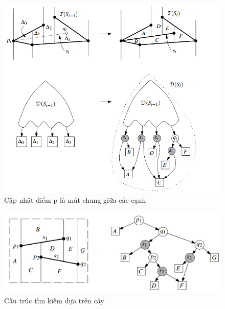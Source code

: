 \documentclass[a4paper,12pt]{report}
\begin{document}
\begin{figure}[H]
\centering
\includegraphics[scale=0.4]{updateT2.png}
\caption{Cập nhật điểm p là mút chung giữa các cạnh}
\label{object_pic}
\end{figure}
\begin{figure}[H]
\centering
\includegraphics[scale=0.4]{trmap3.png}
\caption{Cấu trúc tìm kiếm dựa trên cây}
\label{object_pic}
\end{figure}
\end{document}
